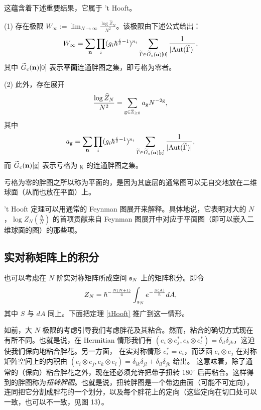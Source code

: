 这蕴含着下述重要结果，它属于 't Hooft。

\begin{theorem} \label{tHooft} (1) 存在极限 
$W_\infty:=\lim_{N\to \infty}\frac{\log\widehat Z_N}{N^2}$。该极限由下述公式给出：
$$
W_\infty=
\sum_{\bold n}\prod_i (g_i\hbar^{\frac{i}{2}-1})^{n_i}
\sum_{\widetilde\Gamma\in \widetilde G_c(\bold n)[0]}
\frac{1}{|{\rm Aut}(\widetilde\Gamma)|},
$$
其中 $\widetilde G_c(\bold n)[0]$ 表示\textbf{平面}连通胖图之集，即亏格为零者。

(2) 此外，存在展开
$$
\frac{\log\widehat Z_N}{N^2}=\sum_{{\rm g}\in \Bbb Z_{\ge  0}}a_{\rm g}N^{-2\rm g},
$$
其中
$$
a_{\rm g}=\sum_{\bold n}\prod_i (g_i\hbar^{\frac{i}{2}-1})^{n_i}
\sum_{\widetilde\Gamma\in \widetilde G_c(\bold n)[{\rm g}]}
\frac{1}{|{\rm Aut}(\widetilde\Gamma)|},
$$
而
$\widetilde G_c(\bold n)[{\rm g}]$ 表示亏格为 ${\rm g}$ 的连通胖图之集。
\end{theorem}

\begin{remark} 亏格为零的胖图之所以称为平面的，是因为其底层的通常图可以无自交地放在二维球面（从而也放在平面）上。
\end{remark}

\begin{remark} 't Hooft 定理可以用通常的 Feynman 图展开来解释。具体地说，它表明对大的 $N$，$\log Z_N(\frac{\hbar}{N})$ 的首项贡献来自 Feynman 图展开中对应于平面图（即可以嵌入二维球面的图）的那些项。
\end{remark} 

\subsection{实对称矩阵上的积分}

也可以考虑在 $N$ 阶实对称矩阵所成空间 ${\frak s}_N$ 上的矩阵积分。即令
$$
Z_N=\hbar^{-\frac{N(N+1)}{4}}\int_{{\frak s}_N} e^{-\frac{S(A)}{\hbar}}dA,
$$ 
其中 $S$ 与 $dA$ 同上。下面把定理 \ref{tHooft} 推广到这一情形。

如前，大 $N$ 极限的考虑引导我们考虑胖花及其粘合。然而，粘合的确切方式现在有所不同。也就是说，在 Hermitian 情形我们有
$(e_i\otimes e_j^*,e_k\otimes e_l^*)=
\delta_{il}\delta_{jk}$，这迫使我们保向地粘合胖花。另一方面，
在实对称情形 $e_i^*=e_i$，而泛函
$e_i\otimes e_j$ 在对称矩阵空间上的内积由
$(e_i\otimes e_j,e_k\otimes e_l)=
\delta_{ik}\delta_{jl}+\delta_{il}\delta_{jk}$ 给出。
这意味着，除了通常的（保向）粘合胖花之外，现在还必须允许把带子扭转 $180^\circ$ 后再粘合。这样得到的胖图称为\emph{扭转胖图}。也就是说，扭转胖图是一个带边曲面（可能不可定向），连同把它分割成胖花的一个划分，以及每个胖花上的定向（这些定向在切口处可以一致，也可以不一致，见图 13）。

